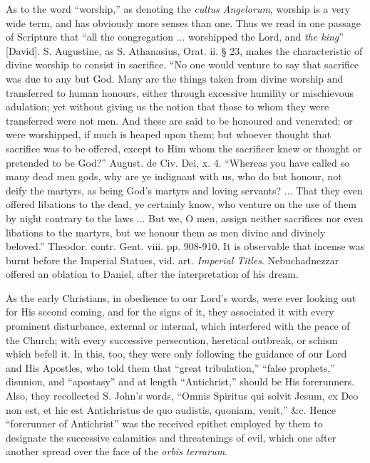 As to the word ``worship,'' as denoting the \emph{cultus
Angelorum}, worship is a very wide term, and has obviously more
senses than one. Thus we read in one passage of Scripture that ``all
the congregation ... worshipped the Lord, and \emph{the king}'' [David]. S.
Augustine, as S. Athanasius, Orat. ii. § 23, makes the characteristic
of divine worship to consist in sacrifice. ``No one would venture to
say that sacrifice was due to any but God. Many are the things taken
from divine worship and transferred to human honours, either through
excessive humility or mischievous adulation; yet without giving us the
notion that those to whom they were transferred were not men. And
these are said to be honoured and venerated; or were worshipped, if
much is heaped upon them; but whoever thought that sacrifice was to be
offered, except to Him whom the sacrificer knew or thought or
pretended to be God?'' August. de Civ. Dei, x. 4. ``Whereas you have
called so many dead men gods, why are ye indignant with us, who do but
honour, not deify the martyrs, as being God's martyrs and loving
servants? ... That they even offered libations to the dead, ye
certainly know, who venture on the use of them by night contrary to
the laws ... But we, O men, assign neither sacrifices nor even
libations to the martyrs, but we honour them as men divine and
divinely beloved.'' Theodor. contr. Gent. viii. pp. 908-910. It is
observable that incense was burnt before the Imperial Statues, vid.
art. \emph{Imperial Titles}. Nebuchadnezzar offered an oblation to
Daniel, after the interpretation of his dream.


As the early Christians, in obedience to our Lord's
words, were ever looking out for His second coming, and for the signs
of it, they associated it with every prominent disturbance, external
or internal, which interfered with the peace of the Church; with every
successive persecution, heretical outbreak, or schism which befell it.
In this, too, they were only following the guidance of our Lord and
His Apostles, who told them that ``great tribulation,'' ``false prophets,''
disunion, and ``apostasy'' and at length ``Antichrist,'' should be His
forerunners. Also, they recollected S. John's words, ``Omnis Spiritus
qui solvit Jesum, ex Deo non est, et hic est Antichristus de quo
audistis, quoniam, venit,'' \&c. Hence ``forerunner of Antichrist''
was the received epithet employed by them to designate the successive
calamities and threatenings of evil, which one after another spread
over the face of the \emph{orbis terrarum}.

